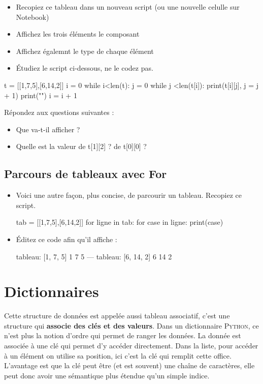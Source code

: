 \begin{itemize}
  \item Recopiez ce tableau dans un nouveau script (ou une nouvelle celulle sur Notebook)
  \item Affichez les trois éléments le composant
  \item Affichez égalemnt le type de chaque élément
\end{itemize}


\begin{itemize}
\item Étudiez le script ci-dessous, ne le codez pas.
\end{itemize}
\begin{python}
t = [[1,7,5],[6,14,2]]
i = 0
while i<len(t):
  j = 0
  while j <len(t[i]):
    print(t[i][j],
    j = j + 1)
  print("")
  i = i + 1
\end{python}
Répondez aux questions suivantes :
\begin{itemize}
 \item Que va-t-il afficher ?
 \item Quelle est la valeur de t[1][2] ? de t[0][0] ?
\end{itemize}


\subsection{Parcours de tableaux avec For}

\begin{itemize}
\item Voici une autre façon, plus concise, de parcourir un tableau. Recopiez ce script.
\begin{python}
tab = [[1,7,5],[6,14,2]]
  for ligne in tab:
    for case in ligne:
      print(case)
\end{python}

\item Éditez ce code afin qu'il affiche :

\begin{python}
tableau: [1, 7, 5]
1
7
5
---
tableau: [6, 14, 2]
6
14
2
\end{python}
\end{itemize}

\section{Dictionnaires}

 Cette structure de données est appelée aussi tableau associatif, c'est une structure qui \textbf{associe des clés et des valeurs}.
 Dans un dictionnaire \textsc{Python}, ce n'est plus la notion d'ordre qui permet de ranger les données. La donnée est associée à une clé qui permet d'y accéder directement.
 Dans la liste, pour accéder à un élément on utilise sa position, ici c'est la clé qui remplit cette office. L'avantage est que la clé peut être (et est souvent) une chaîne de caractères, elle peut donc avoir une sémantique plus étendue qu'un simple indice.

